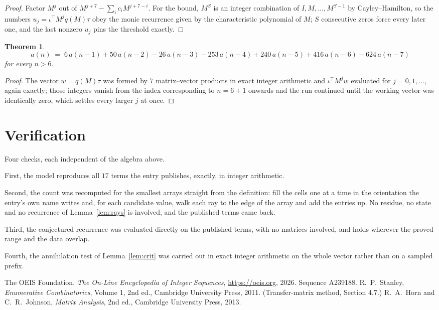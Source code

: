\documentclass[11pt,a4paper]{article}
\theoremstyle{plain}
\newtheorem{theorem}{Theorem}
\theoremstyle{definition}
\begin{document}
\begin{proof}
Factor $M^{j}$ out of $M^{j+7}-\sum_ic_iM^{j+7-i}$. For the bound, $M^{S}$
is an integer combination of $I,M,\dots,M^{S-1}$ by Cayley--Hamilton, so the numbers
$u_j=\iota^{\!\top}M^{j}q(M)\tau$ obey the monic recurrence given by the characteristic
polynomial of $M$; $S$ consecutive zeros force every later one, and the last nonzero $u_j$
pins the threshold exactly.
\end{proof}

\begin{theorem}
\[
a(n)\;=\;6\,a(n-1) + 50\,a(n-2) - 26\,a(n-3) - 253\,a(n-4) + 240\,a(n-5) + 416\,a(n-6) - 624\,a(n-7)
\]
for every $n>6$.
\end{theorem}

\begin{proof}
The vector $w=q(M)\tau$ was formed by $7$ matrix--vector products in exact integer
arithmetic and $\iota^{\!\top}M^{j}w$ evaluated for $j=0,1,\dots$, again exactly; those
integers vanish from the index corresponding to $n=6+1$ onwards and the run continued
until the working vector was identically zero, which settles every larger $j$ at once.
\end{proof}

\section{Verification}

Four checks, each independent of the algebra above.

First, the model reproduces all $17$ terms the entry publishes, exactly, in integer
arithmetic.

Second, the count was recomputed for the smallest arrays straight from the definition: fill the
cells one at a time in the orientation the entry's own name writes and, for each candidate
value, walk each ray to the edge of the array and add the entries up. No residue, no state and
no recurrence of Lemma~\ref{lem:rays} is involved, and the published terms came back.

Third, the conjectured recurrence was evaluated directly on the published terms, with no
matrices involved, and holds wherever the proved range and the data overlap.

Fourth, the annihilation test of Lemma~\ref{lem:crit} was carried out in exact integer
arithmetic on the whole vector rather than on a sampled prefix.

\begin{thebibliography}{9}
 The OEIS Foundation, \emph{The On-Line Encyclopedia of Integer
Sequences}, \url{https://oeis.org}, 2026. Sequence A239188.
 R.~P.~Stanley, \emph{Enumerative Combinatorics}, Volume 1, 2nd ed.,
Cambridge University Press, 2011. (Transfer-matrix method, Section 4.7.)
 R.~A.~Horn and C.~R.~Johnson, \emph{Matrix Analysis}, 2nd ed., Cambridge
University Press, 2013.
\end{thebibliography}
\end{document}

